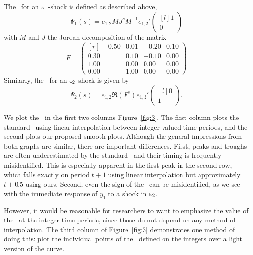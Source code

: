 \documentclass[12pt,fleqn]{article}
\begin{document}
The \IRF\ for an $\varepsilon_1$-shock is defined as described above,
\begin{equation*}
  \Psi_1(s) = e_{1,2} M J^s M^{-1} e_{1,2}'
  \begin{pmatrix*}[l]
    1 \\ 0
  \end{pmatrix*}
\end{equation*}
with $M$ and $J$ the Jordan decomposition of the matrix
\begin{equation*}
F = \begin{pmatrix*}[r]
    - 0.50 & 0.01 & -0.20 & 0.10 \\
      0.30 & 0.10 & -0.10 & 0.00 \\
      1.00 & 0.00 & 0.00 & 0.00 \\
      0.00 & 1.00 & 0.00 & 0.00
  \end{pmatrix*}
\end{equation*}
Similarly, the \IRF\ for an $\varepsilon_2$-shock is given by
\begin{equation*}
  \Psi_2(s) = e_{1,2} \Re(F^s) e_{1,2}'
  \begin{pmatrix*}[l]
    0 \\ 1
  \end{pmatrix*}.
\end{equation*}

We plot the \IRFs\ in the first two columns Figure~\ref{fig:3}. The
first column plots the standard \IRFs\, using linear interpolation
between integer-valued time periods, and the second plots our proposed
smooth plots. Although the general impressions from both graphs are
similar, there are important differences. First, peaks and troughs are
often underestimated by the standard \IRFs\ and their timing is
frequently misidentified. This is especially apparent in the first
peak in the second row, which falls exactly on period $t+1$ using
linear interpolation but approximately $t+0.5$ using ours.  Second,
even the sign of the \IRF\ can be misidentified, as we see with the
immediate response of $y_{1}$ to a shock in $\varepsilon_{2}$.

However, it would be reasonable for researchers to want to emphasize
the value of the \IRF\ at the integer time-periods, since those do not
depend on any method of interpolation. The third column of
Figure~\ref{fig:3} demonstrates one method of doing this: plot the
individual points of the \IRF\ defined on the integers over a light
version of the curve.
\end{document}
